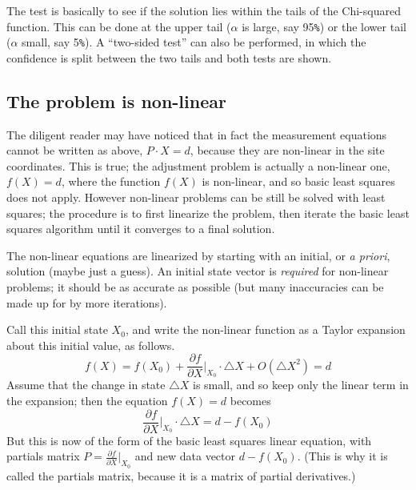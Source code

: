 The test is basically to see if the solution lies within the tails of the Chi-squared function. This can be done at the upper tail ($\alpha$ is large, say 95\verb+%+) or the lower tail ($\alpha$ small, say 5\verb+%+). A ``two-sided test'' can also be performed, in which the confidence is split between the two tails and both tests are shown.

\subsection{The problem is non-linear}
\label{sec:nonlinsolver}
The diligent reader may have noticed that in fact the measurement equations cannot be written as above, $P \cdot X = d$, because they are non-linear in the site coordinates. This is true; the adjustment problem is actually a non-linear one, $f(X) = d$, where the function $f(X)$ is non-linear, and so basic least squares does not apply. However non-linear problems can be still be solved with least squares; the procedure is to first linearize the problem, then iterate the basic least squares algorithm until it converges to a final solution.

The non-linear equations are linearized by starting with an initial, or \emph{a priori}, solution (maybe just a guess). An initial state vector is \emph{required} for non-linear problems; it should be as accurate as possible (but many inaccuracies can be made up for by more iterations).

Call this initial state $X_0$, and write the non-linear function as a Taylor expansion about this initial value, as follows.
\begin{equation}
f(X) = f(X_0) + \frac{\partial f}{\partial X}|_{X_0} \cdot \triangle X + O(\triangle X^2) = d
\end{equation}
Assume that the change in state $\triangle X$ is small, and so keep only the linear term in the expansion; then the equation $f(X) = d$ becomes
\begin{equation}
\frac{\partial f}{\partial X}|_{X_0} \cdot \triangle X = d - f(X_0)
\end{equation}
But this is now of the form of the basic least squares linear equation, with partials matrix $P = \frac{\partial f}{\partial X}|_{X_0}$ and new data vector $d - f(X_0)$. (This is why it is called the partials matrix, because it is a matrix of partial derivatives.)

